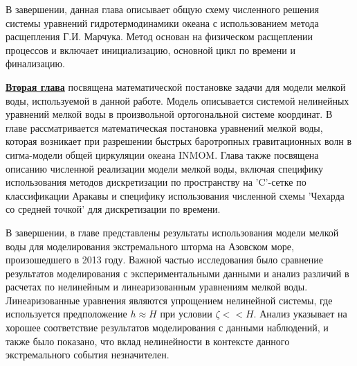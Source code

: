 В завершении, данная глава описывает общую схему численного решения системы уравнений гидротермодинамики океана с использованием метода расщепления Г.И. Марчука. Метод основан на физическом расщеплении процессов и включает инициализацию, основной цикл по времени и финализацию.

\underline{\textbf{Вторая глава}} посвящена математической постановке задачи для модели мелкой воды, используемой в данной работе. Модель описывается системой нелинейных уравнений мелкой воды в произвольной ортогональной системе координат. 
В главе рассматривается математическая постановка уравнений мелкой воды, которая возникает при разрешении быстрых баротропных гравитационных волн в сигма-модели общей циркуляции океана INMOM.
Глава также посвящена описанию численной реализации модели мелкой воды, включая специфику использования методов дискретизации по пространству на 'C'-сетке по классификации Аракавы и специфику использования численной схемы 'Чехарда со средней точкой' для дискретизации по времени.

В завершении, в главе представлены результаты использования модели мелкой воды для моделирования экстремального шторма на Азовском море, произошедшего в 2013 году. Важной частью исследования было сравнение результатов моделирования с экспериментальными данными и анализ различий в расчетах по нелинейным и линеаризованным уравнениям мелкой воды. Линеаризованные уравнения являются упрощением нелинейной системы, где используется предположение $h \approx H$ при условии $\zeta << H$.
Анализ указывает на хорошее соответствие результатов моделирования с данными наблюдений, и также было показано, что вклад нелинейности в контексте данного экстремального события незначителен.

